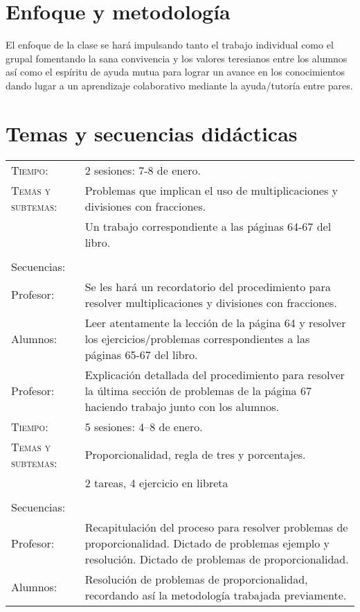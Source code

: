 \documentclass[letterpaper,10pt]{article}
\begin{document}
\vfill

\section{Enfoque y metodolog\'ia}

El enfoque de la clase se har\'a impulsando tanto el trabajo individual como el
grupal fomentando la sana convivencia y los valores teresianos entre los alumnos
as\'i como el esp\'iritu de ayuda mutua para lograr un avance en los
conocimientos dando lugar a un aprendizaje colaborativo mediante la
ayuda/tutor\'ia entre pares.

\vfill

\section{Temas  y secuencias did\'acticas}
\begin{tabular}[t]{R{0.25\textwidth}p{0.71\textwidth}}
    \textsc{Tiempo:}          & 2 sesiones: 7-8 de enero. \\
    \textsc{Temas y subtemas:}& Problemas que implican el uso de 
    multiplicaciones y divisiones con fracciones.\\
    & Un trabajo correspondiente a las 
    p\'aginas 64-67 del libro. \\ \\
    \large{\sc Secuencias:} \\
    Profesor:   & Se les har\'a un recordatorio del procedimiento para resolver 
    multiplicaciones y divisiones con fracciones. \\
    
    Alumnos:     & Leer atentamente la lecci\'on de la p\'agina 64 y resolver los 
    ejercicios/problemas correspondientes a las p\'aginas 65-67 del libro. \\
    
    Profesor: & Explicación detallada del procedimiento para resolver la \'ultima
    secci\'on de problemas de la p\'agina 67 haciendo trabajo junto con los 
    alumnos. \\ 
\hline
\textsc{Tiempo:}          & 5 sesiones: 4--8  de enero. \\
    \textsc{Temas y subtemas:}& Proporcionalidad, regla de tres y porcentajes.\\
    & 2 tareas, 4 ejercicio en libreta\\ \\
    \large{\sc Secuencias:} \\
    
    Profesor:   & Recapitulaci\'on del proceso para resolver problemas de
    proporcionalidad. Dictado de problemas ejemplo y resoluci\'on. Dictado de
    problemas de proporcionalidad.\\ 

    Alumnos:     & Resoluci\'on de problemas de proporcionalidad, recordando
    as\'i la metodolog\'ia trabajada previamente.  \\

\end{tabular}
\\
\newpage
\end{document}
